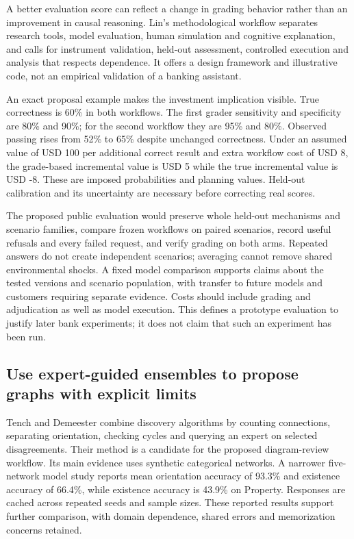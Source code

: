 A better evaluation score can reflect a change in grading behavior
rather than an improvement in causal reasoning. Lin's methodological
workflow separates research tools, model evaluation, human simulation
and cognitive explanation, and calls for instrument validation, held-out
assessment, controlled execution and analysis that respects dependence.
It offers a design framework and illustrative code, not an empirical
validation of a banking assistant. \citep{exec20_validity}

An exact proposal example makes the investment implication visible. True
correctness is 60\% in both workflows. The first grader sensitivity and
specificity are 80\% and 90\%; for the second workflow they are 95\% and
80\%. Observed passing rises from 52\% to 65\% despite unchanged
correctness. Under an assumed value of USD 100 per additional correct
result and extra workflow cost of USD 8, the grade-based incremental
value is USD 5 while the true incremental value is USD -8. These are
imposed probabilities and planning values. Held-out calibration and its
uncertainty are necessary before correcting real scores.
\citep{exec20_validity_reference}

The proposed public evaluation would preserve whole held-out mechanisms
and scenario families, compare frozen workflows on paired scenarios,
record useful refusals and every failed request, and verify grading on
both arms. Repeated answers do not create independent scenarios;
averaging cannot remove shared environmental shocks. A fixed model
comparison supports claims about the tested versions and scenario
population, with transfer to future models and customers requiring
separate evidence. Costs should include grading and adjudication as well
as model execution. This defines a prototype evaluation to justify later
bank experiments; it does not claim that such an experiment has been
run.

\hypertarget{use-expert-guided-ensembles-to-propose-graphs-with-explicit-limits}{%
\subsection{Use expert-guided ensembles to propose graphs with explicit
limits}\label{use-expert-guided-ensembles-to-propose-graphs-with-explicit-limits}}

Tench and Demeester combine discovery algorithms by counting
connections, separating orientation, checking cycles and querying an
expert on selected disagreements. Their method is a candidate for the
proposed diagram-review workflow. Its main evidence uses synthetic
categorical networks. A narrower five-network model study reports mean
orientation accuracy of 93.3\% and existence accuracy of 66.4\%, while
existence accuracy is 43.9\% on Property. Responses are cached across
repeated seeds and sample sizes. These reported results support further
comparison, with domain dependence, shared errors and memorization
concerns retained. \citep{exec20_expert_averaging}

